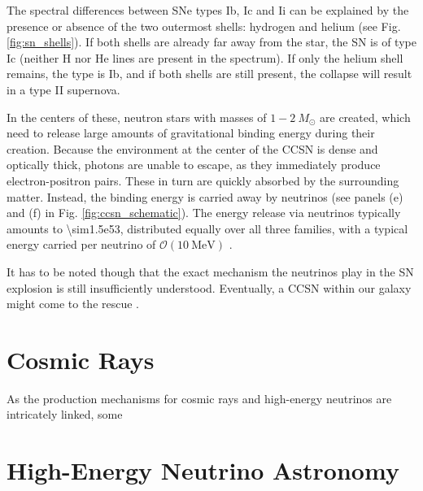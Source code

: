 \documentclass[
    a4paper, %
    fontsize=10pt, %
    twoside=false, %
    numbers=noenddot, %
    fontmethod=tex,
]{kaobook}
\begin{document}
The spectral differences between SNe types Ib, Ic and Ii can be explained by the presence or absence of the two outermost shells: hydrogen and helium (see Fig. \ref{fig:sn_shells}). If both shells are already far away from the star, the SN is of type Ic (neither H nor He lines are present in the spectrum). If only the helium shell remains, the type is Ib, and if both shells are still present, the collapse will result in a type II supernova.


In the centers of these, neutron stars with masses of $1-2~M_\odot$ are created, which need to release large amounts of gravitational binding energy during their creation. Because the environment at the center of the CCSN is dense and optically thick, photons are unable to escape, as they immediately produce electron-positron pairs. These in turn are quickly absorbed by the surrounding matter. Instead, the binding energy is carried away by neutrinos (see panels (e) and (f) in Fig. \ref{fig:ccsn_schematic}). The energy release via neutrinos typically amounts to \SI{\sim1.5e53}{\erg}, distributed equally over all three families, with a typical energy carried per neutrino of $\mathcal{O}(\SI{10}{\mega\eV})$ . 

It has to be noted though that the exact mechanism the neutrinos play in the SN explosion is still insufficiently understood. Eventually, a CCSN within our galaxy might come to the rescue .

\section{Cosmic Rays}
As the production mechanisms for cosmic rays and high-energy neutrinos are intricately linked, some 

\section{High-Energy Neutrino Astronomy}
\end{document}
